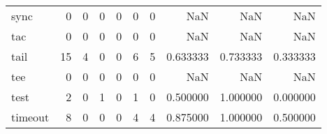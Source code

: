\begin{tabular}{lrrrrrrrrr}
sync      &                                                  0 &                                                  0 &                                                  0 &                                                  0 &                                                  0 &                                                  0 &                                                NaN &                                    NaN &                                  NaN \\
tac       &                                                  0 &                                                  0 &                                                  0 &                                                  0 &                                                  0 &                                                  0 &                                                NaN &                                    NaN &                                  NaN \\
tail      &                                                 15 &                                                  4 &                                                  0 &                                                  0 &                                                  6 &                                                  5 &                                           0.633333 &                               0.733333 &                             0.333333 \\
tee       &                                                  0 &                                                  0 &                                                  0 &                                                  0 &                                                  0 &                                                  0 &                                                NaN &                                    NaN &                                  NaN \\
test      &                                                  2 &                                                  0 &                                                  1 &                                                  0 &                                                  1 &                                                  0 &                                           0.500000 &                               1.000000 &                             0.000000 \\
timeout   &                                                  8 &                                                  0 &                                                  0 &                                                  0 &                                                  4 &                                                  4 &                                           0.875000 &                               1.000000 &                             0.500000 \\

\end{tabular}
